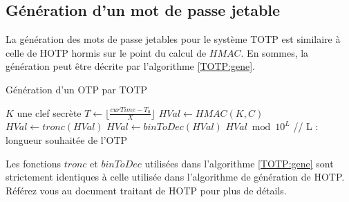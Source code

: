 \documentclass{../res/univ-projet}
\begin{document}
  \subsection{Génération d'un mot de passe jetable}
    La génération des mots de passe jetables pour le système \og{}TOTP\fg{} est similaire à celle de \og{}HOTP\fg{} hormis sur le point du calcul de $HMAC$. En sommes, la 
    génération peut \^etre décrite par l'algorithme \ref{TOTP:gene}.
    \begin{algorithm}
      \caption{Génération d'un OTP par TOTP}
      \label{TOTP:gene}
   
      \begin{algorithmic}
	\REQUIRE $K$ une clef secrète
	\STATE $T \leftarrow \lfloor{}\frac{curTime - T_0}{X}\rfloor{}$
	\STATE $HVal \leftarrow HMAC(K, C)$
	\STATE $HVal \leftarrow tronc(HVal)$
	\STATE $HVal \leftarrow binToDec(HVal)$
	\newline
	\RETURN $HVal \bmod 10^L$ // L : longueur souhaitée de l'OTP
      \end{algorithmic}
    \end{algorithm}
    
    Les fonctions $tronc$ et $binToDec$ utilisées dans l'algorithme \ref{TOTP:gene} sont strictement identiques à celle utilisée dans l'algorithme de génération de 
    \og{}HOTP\fg{}. Référez vous au document traitant de \og{}HOTP\fg{} pour plus de détails.
    
\end{document}
